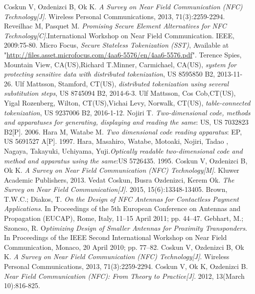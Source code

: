 \documentclass[journal]{IEEEtran}
\begin{document}
\begin{thebibliography}{1}
Coskun V, Ozdenizci B, Ok K. \emph{A Survey on Near Field Communication (NFC) Technology[J]}. Wireless Personal Communications, 2013, 71(3):2259-2294.
Reveilhac M, Pasquet M. \emph{Promising Secure Element Alternatives for NFC Technology[C]}.International Workshop on Near Field Communication. IEEE, 2009:75-80.
Micro Focus, \emph{Secure Stateless Tokenization (SST)}, Available at "\url{http://files.asset.microfocus.com/4aa6-5576/en/4aa6-5576.pdf}".
Terence Spies, Mountain View, CA(US),Richard T.Minner, Carmichael, CA(US), \emph{system for protecting sensitive data with distributed tokenization}, US 8595850 B2, 2013-11-26.
Ulf Mattsson, Stamford, CT(US), \emph{distributed tokenization using several substitution steps}, US 8745094 B2, 2014-6-3.
Ulf Mattsson, Cos Cob,CT(US), Yigal Rozenberg, Wilton, CT(US),Vichai Levy, Norwalk, CT(US), \emph{table-connected tokenization}, US 9237006 B2, 2016-1-12. 
Nojiri T. \emph{Two-dimensional code, methods and apparatuses for generating, displaying and reading the same}: US, US 7032823 B2[P]. 2006.
Hara M, Watabe M. \emph{Two dimensional code reading apparatus}: EP, US 5691527 A[P]. 1997.
Hara, Masahiro, Watabe, Motoaki, Nojiri, Tadao , Nagaya, Takayuki, Uchiyama, Yuji.\emph{Optically readable two-dimensional code and method and apparatus using the same}:US 5726435. 1995.
Coskun V, Ozdenizci B, Ok K. \emph{A Survey on Near Field Communication (NFC) Technology[M]}. Kluwer Academic Publishers, 2013.
Vedat Coskun, Busra Ozdenizci, Kerem Ok. \emph{The Survey on Near Field Communication[J]}. 2015, 15(6):13348-13405.
Brown, T.W.C.; Diakos, T. \emph{On the Design of NFC Antennas for Contactless Payment Applications}. In Proceedings of the 5th European Conference on Antennas and Propagation (EUCAP), Rome, Italy, 11–15 April 2011; pp. 44–47.
Gebhart, M.; Szoncso, R. O\emph{ptimizing Design of Smaller Antennas for Proximity Transponders}.
In Proceedings of the IEEE Second International Workshop on Near Field Communication,
Monaco, 20 April 2010; pp. 77–82.
Coskun V, Ozdenizci B, Ok K. \emph{A Survey on Near Field Communication (NFC) Technology[J]}. Wireless Personal Communications, 2013, 71(3):2259-2294.
Coskun V, Ok K, Ozdenizci B. \emph{Near Field Communication (NFC): From Theory to Practice[J]}. 2012, 13(March 10):816-825.


\end{thebibliography}
\end{document}
